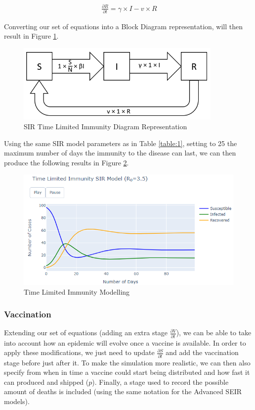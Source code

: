 \useshortskip
\begin{align}
\ \frac{\partial R}{\partial t} = \gamma \times I - v \times R
\end{align}
\useshortskip

Converting our set of equations into a Block Diagram representation, will then result in Figure \ref{dimm}.

\begin{figure}[ht!]%
    \centering
    \includegraphics[width=10cm]{latex/images/dimm.PNG}%
    \caption{SIR Time Limited Immunity Diagram Representation}
    \label{dimm}
\end{figure}

Using the same SIR model parameters as in Table \ref{table:1}, setting to 25 the maximum number of days the immunity to the disease can last, we can then produce the following results in Figure \ref{low_imm}.

\begin{figure}[ht!]%
    \centering
    \includegraphics[width=13cm]{latex/images/time_lim.PNG}%
    \caption{Time Limited Immunity Modelling}
    \label{low_imm}
\end{figure}

\subsubsection{Vaccination}

Extending our set of equations (adding an extra stage $\frac{\partial V}{\partial t}$), we can be able to take into account how an epidemic will evolve once a vaccine is available. In order to apply these modifications, we just need to update $\frac{\partial S}{\partial t}$ and add the vaccination stage before just after it. To make the simulation more realistic, we can then also specify from when in time a vaccine could start being distributed and how fast it can produced and shipped ($p$). Finally, a stage used to record the possible amount of deaths is included (using the same notation for the Advanced SEIR models).

